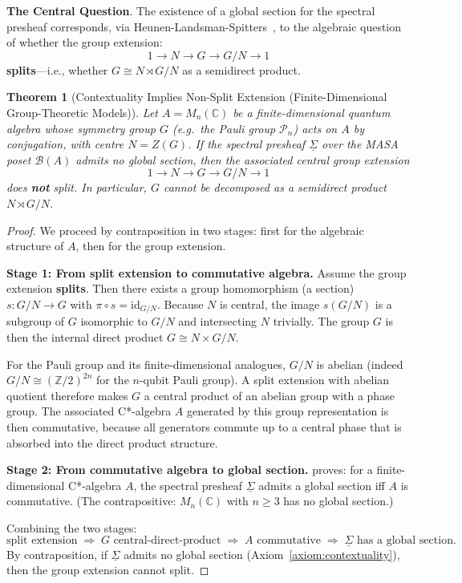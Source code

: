 \documentclass[11pt]{article}
\newtheorem{theorem}{Theorem}[section]
\begin{document}
\textbf{The Central Question}.
The existence of a global section for the spectral presheaf corresponds, via Heunen-Landsman-Spitters~\cite[Theorem 5.3]{Heunen2012}, to the algebraic question of whether the group extension:
\[
1 \longrightarrow N \longrightarrow G \longrightarrow G/N \longrightarrow 1
\]
\textbf{splits}---i.e., whether $G \cong N \rtimes G/N$ as a semidirect product.

\begin{theorem}[Contextuality Implies Non-Split Extension (Finite-Dimensional Group-Theoretic Models)]
\label{thm:contextuality-non-split}
Let $A = M_n(\mathbb{C})$ be a finite-dimensional quantum algebra whose symmetry group $G$ (e.g.\ the Pauli group $\mathcal{P}_n$) acts on $A$ by conjugation, with centre $N = Z(G)$. If the spectral presheaf $\underline{\Sigma}$ over the MASA poset $\mathcal{B}(A)$ admits no global section, then the associated central group extension
\[
1 \longrightarrow N \longrightarrow G \longrightarrow G/N \longrightarrow 1
\]
does \textbf{not} split. In particular, $G$ cannot be decomposed as a semidirect product $N \rtimes G/N$.
\end{theorem}

\begin{proof}
We proceed by contraposition in two stages: first for the algebraic structure of $A$, then for the group extension.

\textbf{Stage 1: From split extension to commutative algebra.}
Assume the group extension \textbf{splits}. Then there exists a group homomorphism (a section) $s: G/N \to G$ with $\pi \circ s = \mathrm{id}_{G/N}$. Because $N$ is central, the image $s(G/N)$ is a subgroup of $G$ isomorphic to $G/N$ and intersecting $N$ trivially. The group $G$ is then the internal direct product $G \cong N \times G/N$.

For the Pauli group and its finite-dimensional analogues, $G/N$ is abelian (indeed $G/N \cong (\mathbb{Z}/2)^{2n}$ for the $n$-qubit Pauli group). A split extension with abelian quotient therefore makes $G$ a central product of an abelian group with a phase group. The associated C*-algebra $A$ generated by this group representation is then commutative, because all generators commute up to a central phase that is absorbed into the direct product structure.

\textbf{Stage 2: From commutative algebra to global section.}
\cite[Theorem~5.3]{Heunen2012} proves: for a finite-dimensional C*-algebra $A$, the spectral presheaf $\underline{\Sigma}$ admits a global section iff $A$ is commutative. (The contrapositive: $M_n(\mathbb{C})$ with $n \ge 3$ has no global section.)

Combining the two stages:
\[
\text{split extension} \;\Rightarrow\; G \text{ central-direct-product} \;\Rightarrow\; A \text{ commutative} \;\Rightarrow\; \underline{\Sigma} \text{ has a global section}.
\]
By contraposition, if $\underline{\Sigma}$ admits no global section (Axiom~\ref{axiom:contextuality}), then the group extension cannot split.
\end{proof}
\end{document}
